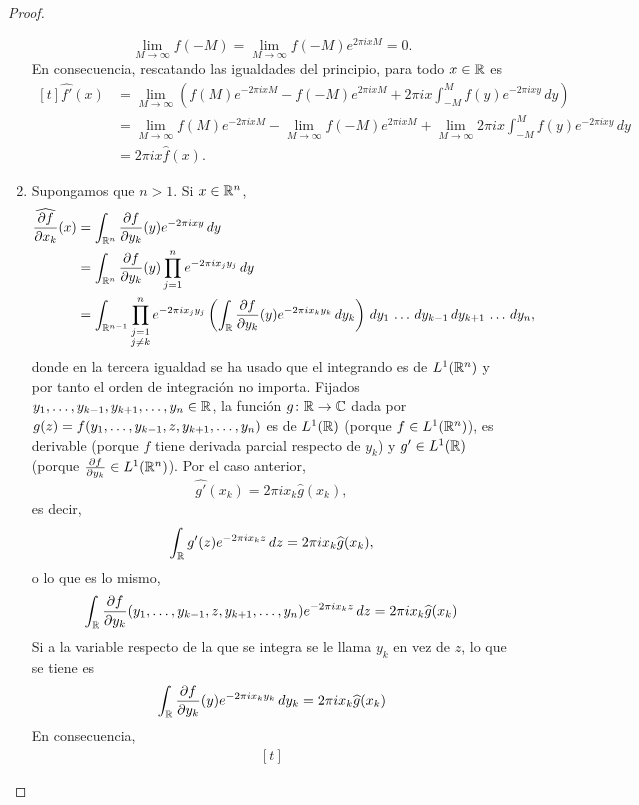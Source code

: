 \documentclass[a4paper, 11pt, oneside]{report}
\begin{document}
\begin{proof}
\begin{enumerate}
    \[\lim_{M \to \infty} f(-M)= \lim_{M \to \infty} f(-M)e^{2\pi i xM} = 0.\]
    En consecuencia, rescatando las igualdades del principio, para todo $x \in \mathbb R$ es
    \[\begin{aligned}[t]
      \widehat{f'}(x) &= \lim_{M \to \infty} \left(f(M)e^{-2\pi i xM} - f(-M)e^{2\pi i x M} + 2\pi i x \int_{-M}^Mf(y)e^{-2\pi i xy} \, dy\right) \\
      &= \lim_{M \to \infty} f(M)e^{-2\pi i x M} - \lim_{M \to \infty} f(-M)e^{2\pi i xM} + \lim_{M \to \infty} 2\pi i x\int_{-M}^M f(y)e^{-2\pi i xy }\, dy \\
      &= 2\pi i x\widehat{f}(x).
    \end{aligned}\]
    \item Supongamos que $n > 1$. Si $x \in \mathbb R^n$,
    \[\begin{aligned}[t]
      \widehat{\frac{\partial f}{\partial x_k}}(x) &= \int_{\mathbb R^n} \frac{\partial f}{\partial y_k}(y)e^{-2\pi i xy } \, dy \\
      &= \int_{\mathbb R^n} \frac{\partial f}{\partial y_k}(y)\prod_{j=1}^n e^{-2\pi i x_jy_j} \, dy \\
      &= \int_{\mathbb R^{n-1}}\prod_{\substack{j = 1 \\ j \neq k}}^n e^{-2\pi i x_jy_j} \left(\int_\mathbb R \frac{\partial f}{\partial y_k}(y)e^{-2\pi i x_k y_k} \, dy_k\right) \, dy_1 \, \mathellipsis \, dy_{k-1} \, dy_{k+1} \, \mathellipsis \, dy_n,
    \end{aligned}\]
    donde en la tercera igualdad se ha usado que el integrando es de $L^1(\mathbb R^n)$ y por tanto el orden de integración no importa. Fijados $y_1,\mathellipsis,y_{k-1},y_{k+1},\mathellipsis,y_n \in \mathbb R$, la función $g \colon \mathbb R \to \mathbb C$ dada por $g(z) = f(y_1,\mathellipsis,y_{k-1}, z, y_{k+1},\mathellipsis,y_n)$ es de $L^1(\mathbb R)$ (porque $f \in L^1(\mathbb R^n)$), es derivable (porque $f$ tiene derivada parcial respecto de $y_k$) y $g' \in L^1(\mathbb R)$ (porque $\frac{\partial f}{\partial y_k} \in L^1(\mathbb R^n)$). Por el caso anterior,
    \[\widehat{g'}(x_k) = 2\pi i x_k\widehat{g}(x_k),\]
    es decir,
    \[\int_{\mathbb R} g'(z) e^{-2\pi i x_k z} \, dz = 2\pi i x_k\widehat{g}(x_k),\]
    o lo que es lo mismo,
    \[\int_{\mathbb R} \frac{\partial f}{\partial y_k}(y_1,\mathellipsis,y_{k-1},z,y_{k+1},\mathellipsis,y_n)e^{-2\pi i x_k z} \, dz = 2\pi i x_k \widehat{g}(x_k)\]
    Si a la variable respecto de la que se integra se le llama $y_k$ en vez de $z$, lo que se tiene es
    \[\int_{\mathbb R} \frac{\partial f}{\partial y_k}(y)e^{-2\pi i x_k y_k} \, dy_k = 2\pi i x_k \widehat{g}(x_k)\]
    En consecuencia, 
    \[\begin{aligned}[t]

\end{aligned}\]
\end{enumerate}
\end{proof}
\end{document}

